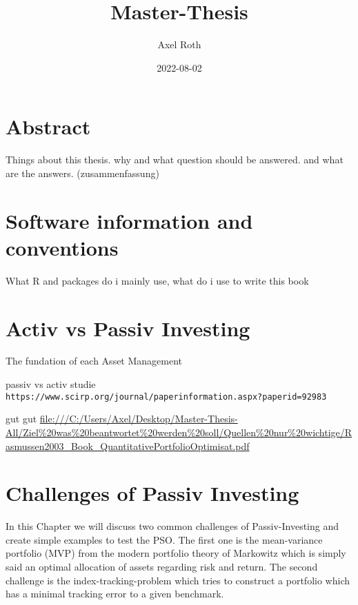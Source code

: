 \documentclass[
  oneside]{book}
\title{Master-Thesis}
\author{Axel Roth}
\date{2022-08-02}
\begin{document}
\maketitle

{
\setcounter{tocdepth}{1}
\tableofcontents
}
\hypertarget{abstract}{%
\chapter{Abstract}\label{abstract}}

Things about this thesis. why and what question should be answered. and what are the answers. (zusammenfassung)

\hypertarget{software-information-and-conventions}{%
\chapter{Software information and conventions}\label{software-information-and-conventions}}

What R and packages do i mainly use, what do i use to write this book

\hypertarget{activ-vs-passiv-investing}{%
\chapter{Activ vs Passiv Investing}\label{activ-vs-passiv-investing}}

The fundation of each Asset Management

passiv vs activ studie
\texttt{https://www.scirp.org/journal/paperinformation.aspx?paperid=92983}

gut gut
\url{file:///C:/Users/Axel/Desktop/Master-Thesis-All/Ziel\%20was\%20beantwortet\%20werden\%20soll/Quellen\%20nur\%20wichtige/Rasmussen2003_Book_QuantitativePortfolioOptimisat.pdf}

\hypertarget{challenges-of-passiv-investing}{%
\chapter{Challenges of Passiv Investing}\label{challenges-of-passiv-investing}}

In this Chapter we will discuss two common challenges of Passiv-Investing and create simple examples to test the PSO. The first one is the mean-variance portfolio (MVP) from the modern portfolio theory of Markowitz which is simply said an optimal allocation of assets regarding risk and return. The second challenge is the index-tracking-problem which tries to construct a portfolio which has a minimal tracking error to a given benchmark.
\end{document}
